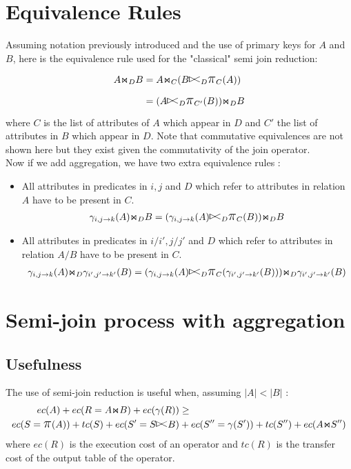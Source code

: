 \documentclass[11pt]{article}
\newcommand{\join}{\mbox{$\Join$}}
\newcommand{\leftsemijoin}{\mbox{$\mathrel{\raise1pt\hbox{\vrule height5pt
depth0pt width0.6pt\hskip-1.5pt$>$\hskip -2.5pt$<$}}$}}
\newcommand{\project}{\mbox{\Large$\pi$}}
\begin{document}
\pagebreak
\section*{Equivalence Rules}

Assuming notation previously introduced and the use of primary keys for $A$ and $B$, here is the equivalence rule used for the "classical" semi join reduction:
\begin{align*}
A \join_D B & = A \join_C ( B \leftsemijoin_D \project_C(A) )\\
& = (A \leftsemijoin_D \project_{C'}(B)) \join_D B\\
\end{align*}
where $C$ is the list of attributes of $A$ which appear in $D$ and $C'$ the list of attributes in $B$ which appear in $D$. Note that commutative equivalences are not shown here but they exist given the commutativity of the join operator.\\

Now if we add aggregation, we have two extra equivalence rules :
\begin{itemize}
\item{ All attributes in predicates in $i,j$ and $D$ which refer to attributes in relation $A$ have to be present in $C$. 
\begin{align*}
\gamma_{i,j \rightarrow k}(A) \join_D B = (\gamma_{i,j \rightarrow k}(A) \leftsemijoin_D  \project_C(B)) \join_D B\\
\end{align*}}
\item{All attributes in predicates in $i/i',j/j'$ and $D$ which refer to attributes in relation $A/B$ have to be present in $C$.
\begin{align*}
\gamma_{i,j \rightarrow k}(A) \join_D \gamma_{i',j' \rightarrow k'}(B) = (\gamma_{i,j \rightarrow k}(A) \leftsemijoin_D  \project_C(\gamma_{i',j' \rightarrow k'}(B))) \join_D \gamma_{i',j' \rightarrow k'}(B) \\
\end{align*}}
\end{itemize}

\pagebreak
\section*{Semi-join process with aggregation}

\subsection*{Usefulness}
The use of semi-join reduction is useful when, assuming $|A| < |B|$ :
\begin{align*}
ec(A) + ec( R = A \join B) + ec(\gamma(R)) & \ge \\
ec(S = \project(A)) + tc(S) + ec (S' = S \leftsemijoin B) & + ec (S'' = \gamma(S')) + tc(S'') + ec(A \join S'')
\end{align*}
where $ec(R)$ is the execution cost of an operator and $tc(R)$ is the transfer cost of the output table of the operator.
\pagebreak
\end{document}
